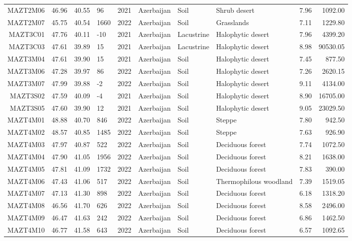 \begin{table}[ht]
\begin{tabular}{rrrlrlllrr}
  MAZT2M06 & 46.96 & 40.55 & 96 & 2021 & Azerbaijan & Soil & Shrub desert & 7.96 & 1092.00 \\ 
  MAZT2M07 & 45.75 & 40.54 & 1660 & 2022 & Azerbaijan & Soil & Grasslands & 7.11 & 1229.80 \\ 
  MAZT3C01 & 47.76 & 40.11 & -10 & 2021 & Azerbaijan & Lacustrine & Halophytic desert & 7.96 & 4399.20 \\ 
  MAZT3C03 & 47.61 & 39.89 & 15 & 2021 & Azerbaijan & Lacustrine & Halophytic desert & 8.98 & 90530.05 \\ 
  MAZT3M04 & 47.61 & 39.90 & 15 & 2021 & Azerbaijan & Soil & Halophytic desert & 7.45 & 877.50 \\ 
  MAZT3M06 & 47.28 & 39.97 & 86 & 2022 & Azerbaijan & Soil & Halophytic desert & 7.26 & 2620.15 \\ 
  MAZT3M07 & 47.99 & 39.88 & -2 & 2022 & Azerbaijan & Soil & Halophytic desert & 9.11 & 4134.00 \\ 
  MAZT3S02 & 47.59 & 40.09 & -4 & 2021 & Azerbaijan & Soil & Halophytic desert & 8.90 & 16705.00 \\ 
  MAZT3S05 & 47.60 & 39.90 & 12 & 2021 & Azerbaijan & Soil & Halophytic desert & 9.05 & 23029.50 \\ 
  MAZT4M01 & 48.88 & 40.70 & 846 & 2022 & Azerbaijan & Soil & Steppe & 7.80 & 942.50 \\ 
  MAZT4M02 & 48.57 & 40.85 & 1485 & 2022 & Azerbaijan & Soil & Steppe & 7.63 & 926.90 \\ 
  MAZT4M03 & 47.97 & 40.87 & 522 & 2022 & Azerbaijan & Soil & Deciduous forest & 7.74 & 1072.50 \\ 
  MAZT4M04 & 47.90 & 41.05 & 1956 & 2022 & Azerbaijan & Soil & Deciduous forest & 8.21 & 1638.00 \\ 
  MAZT4M05 & 47.81 & 41.09 & 1732 & 2022 & Azerbaijan & Soil & Deciduous forest & 7.83 & 390.00 \\ 
  MAZT4M06 & 47.43 & 41.06 & 517 & 2022 & Azerbaijan & Soil & Thermophilous woodland & 7.39 & 1519.05 \\ 
  MAZT4M07 & 47.13 & 41.30 & 898 & 2022 & Azerbaijan & Soil & Deciduous forest & 6.18 & 1318.20 \\ 
  MAZT4M08 & 46.56 & 41.70 & 626 & 2022 & Azerbaijan & Soil & Deciduous forest & 8.58 & 2496.00 \\ 
  MAZT4M09 & 46.47 & 41.63 & 242 & 2022 & Azerbaijan & Soil & Deciduous forest & 6.86 & 1462.50 \\ 
  MAZT4M10 & 46.77 & 41.58 & 643 & 2022 & Azerbaijan & Soil & Deciduous forest & 6.57 & 1092.65 \\ 

\end{tabular}
\end{table}
